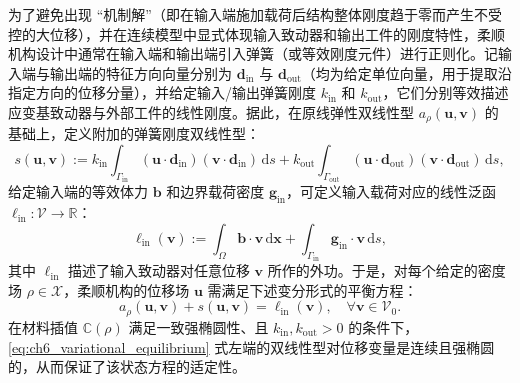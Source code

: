 为了避免出现 “机制解”（即在输入端施加载荷后结构整体刚度趋于零而产生不受控的大位移），并在连续模型中显式体现输入致动器和输出工件的刚度特性，柔顺机构设计中通常在输入端和输出端引入弹簧（或等效刚度元件）进行正则化。记输入端与输出端的特征方向向量分别为 $\boldsymbol{d}_{\mathrm{in}}$ 与 $\boldsymbol{d}_{\mathrm{out}}$（均为给定单位向量，用于提取沿指定方向的位移分量），并给定输入/输出弹簧刚度 $k_{\mathrm{in}}$ 和 $k_{\mathrm{out}}$，它们分别等效描述应变基致动器与外部工件的线性刚度。据此，在原线弹性双线性型 $a_\rho(\boldsymbol{u},\boldsymbol{v})$ 的基础上，定义附加的弹簧刚度双线性型：
\[
s(\boldsymbol{u},\boldsymbol{v}) := k_{\mathrm{in}}\int_{\Gamma_{\mathrm{in}}}(\boldsymbol{u}\cdot\boldsymbol{d}_{\mathrm{in}})(\boldsymbol{v}\cdot\boldsymbol{d}_{\mathrm{in}})\,\mathrm{d}s + k_{\mathrm{out}}\int_{\Gamma_{\mathrm{out}}}(\boldsymbol{u}\cdot\boldsymbol{d}_{\mathrm{out}})(\boldsymbol{v}\cdot\boldsymbol{d}_{\mathrm{out}})\,\mathrm{d}s,
\]
给定输入端的等效体力 $\boldsymbol{b}$ 和边界载荷密度 $\boldsymbol{g}_{\mathrm{in}}$，可定义输入载荷对应的线性泛函 $\ell_{\mathrm{in}}:\mathcal{V}\to\mathbb{R}$：
\[
\ell_{\mathrm{in}}(\boldsymbol{v}) := \int_{\Omega}\boldsymbol{b}\cdot\boldsymbol{v}\,\mathrm{d}\boldsymbol{x} + \int_{\Gamma_{\mathrm{in}}}\boldsymbol{g}_{\mathrm{in}}\cdot\boldsymbol{v}\,\mathrm{d}s,
\]
其中 $\ell_{\mathrm{in}}$ 描述了输入致动器对任意位移 $\boldsymbol{v}$ 所作的外功。于是，对每个给定的密度场 $\rho\in\mathcal{X}$，柔顺机构的位移场 $\boldsymbol{u}$ 需满足下述变分形式的平衡方程：
\begin{equation} 
	a_\rho(\boldsymbol{u},\boldsymbol{v}) + s(\boldsymbol{u},\boldsymbol{v}) = \ell_{\mathrm{in}}(\boldsymbol{v}),\quad \forall \boldsymbol{v}\in\mathcal{V}_0.
	\label{eq:ch6_variational_equilibrium}
\end{equation}
在材料插值 $\mathbb{C}(\rho)$ 满足一致强椭圆性、且 $k_{\mathrm{in}},k_{\mathrm{out}}>0$ 的条件下，\eqref{eq:ch6_variational_equilibrium} 式左端的双线性型对位移变量是连续且强椭圆的，从而保证了该状态方程的适定性。

